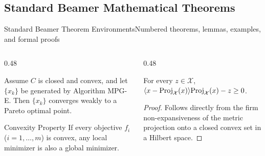 \documentclass[aspectratio=43,10pt]{beamer}
\begin{document}
\subsection{Standard Beamer Mathematical Theorems}
\begin{frame}{Standard Beamer Theorem Environments}{Numbered theorems, lemmas, examples, and formal proofs}
  \begin{columns}[T]
    \begin{column}{0.48\textwidth}
      \begin{theorem}
        Assume $C$ is closed and convex, and let $\{x_k\}$ be generated by Algorithm MPG-E. Then $\{x_k\}$ converges weakly to a Pareto optimal point.
      \end{theorem}
      \vskip 2pt
      \begin{exampleblock}{Convexity Property}
        If every objective $f_i$ ($i = 1,\dots,m$) is convex, any local minimizer is also a global minimizer.
      \end{exampleblock}
    \end{column}

    \begin{column}{0.48\textwidth}
      \begin{lemma}
        \raggedright For every $z \in \mathcal{X}$, $\langle x - \mathrm{Proj}_{\mathcal{X}}(x)\rangle{\mathrm{Proj}_{\mathcal{X}}(x) - z} \ge 0$.
      \end{lemma}
      \vskip 2pt
      \begin{proof}
        Follows directly from the firm non-expansiveness of the metric projection onto a closed convex set in a Hilbert space.
      \end{proof}
    \end{column}
  \end{columns}
\end{frame}
\end{document}
